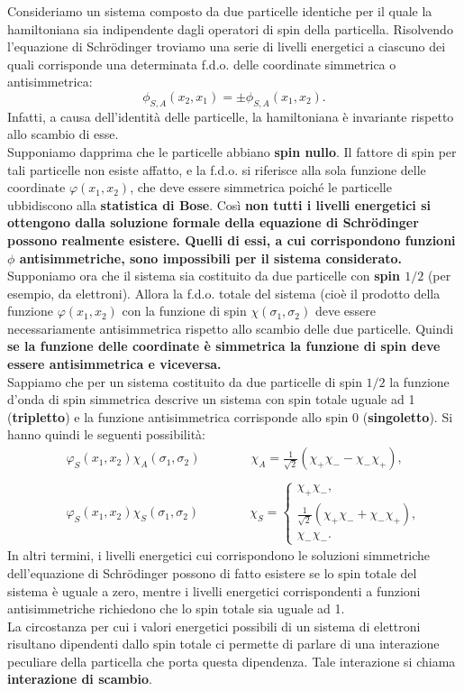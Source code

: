 \documentclass[a4paper,12pt,oneside]{book}
\begin{document}
Consideriamo un sistema composto da due particelle identiche per il quale la hamiltoniana sia indipendente dagli operatori di spin della particella. Risolvendo l'equazione di Schr\"{o}dinger troviamo una serie di livelli energetici a ciascuno dei quali corrisponde una determinata f.d.o. delle coordinate simmetrica o antisimmetrica:
\begin{equation}
\phi_{S,A}(x_2,x_1)= \pm \phi_{S,A}(x_1,x_2) .
\end{equation}
Infatti, a causa dell'identità delle particelle, la hamiltoniana è invariante rispetto allo scambio di esse.\\
Supponiamo dapprima che le particelle abbiano \textbf{spin nullo}. Il fattore di spin per tali particelle non esiste affatto, e la f.d.o. si riferisce alla sola funzione delle coordinate $\varphi(x_1, x_2)$, che deve essere simmetrica poiché le particelle ubbidiscono alla \textbf{statistica di Bose}. Così \textbf{non tutti i livelli energetici si ottengono dalla soluzione formale della equazione di Schr\"{o}dinger possono realmente esistere. Quelli di essi, a cui corrispondono funzioni $\phi$ antisimmetriche, sono impossibili per il sistema considerato.}\\
Supponiamo ora che il sistema sia costituito da due particelle con \textbf{spin $1/2$} (per esempio, da elettroni). Allora la f.d.o. totale del sistema (cioè il prodotto della funzione $\varphi(x_1,x_2)$ con la funzione di spin $\chi(\sigma_1, \sigma_2)$ deve essere necessariamente antisimmetrica rispetto allo scambio delle due particelle. Quindi \textbf{se la funzione delle coordinate è simmetrica la funzione di spin deve essere antisimmetrica e viceversa.}\\
Sappiamo che per un sistema costituito da due particelle di spin $1/2$ la funzione d'onda di spin simmetrica descrive un sistema con spin totale uguale ad 1 (\textbf{tripletto}) e la funzione antisimmetrica corrisponde allo spin 0 (\textbf{singoletto}). Si hanno quindi le seguenti possibilità:
\begin{eqnarray}
& &\varphi_S(x_1,x_2)\chi_A(\sigma_1,\sigma_2)\qquad \qquad \chi_A=\frac{1}{\sqrt{2}}(\chi_+\chi_--\chi_-\chi_+) , \\
\nonumber \\
& &\varphi_S(x_1,x_2)\chi_S(\sigma_1,\sigma_2)\qquad \qquad \chi_S=
\begin{cases}
\chi_+\chi_- , \\
\frac{1}{\sqrt{2}}(\chi_+\chi_-+\chi_-\chi_+), \\
\chi_-\chi_-.
\end{cases} 
\end{eqnarray}
In altri termini, i livelli energetici cui corrispondono le soluzioni simmetriche dell'equazione di Schr\"{o}dinger possono di fatto esistere se lo spin totale del sistema è uguale a zero, mentre i livelli energetici corrispondenti a funzioni antisimmetriche richiedono che lo spin totale sia uguale ad 1.\\
La circostanza per cui i valori energetici possibili di un sistema di elettroni risultano dipendenti dallo spin totale ci permette di parlare di una interazione peculiare della particella che porta questa dipendenza. Tale interazione si chiama \textbf{interazione di scambio}.
\end{document}
